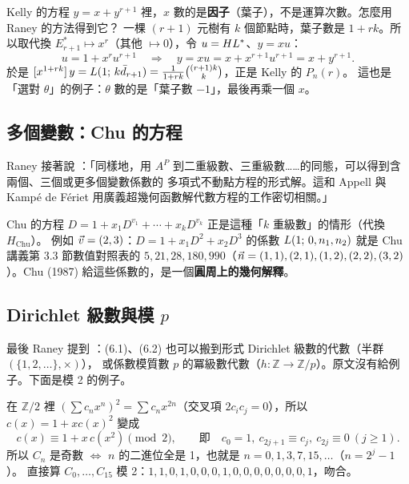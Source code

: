 Kelly 的方程 $y=x+y^{r+1}$ 裡，$x$ 數的是\textbf{因子}（葉子），不是運算次數。怎麼用 Raney 的方法得到它？
一棵 $(r+1)$ 元樹有 $k$ 個節點時，葉子數是 $1+rk$。所以取代換 $E_{r+1}^*\mapsto x^r$（其他 $\mapsto0$），令 $u=HL^{*}$、$y=xu$：
\[
u=1+x^r u^{r+1}\quad\Longrightarrow\quad y=xu=x+x^{r+1}u^{r+1}=x+y^{r+1}.
\]
於是 $[x^{1+rk}]\,y=L(1;\,k\bar d_{r+1})=\frac{1}{1+rk}\binom{(r+1)k}{k}$，正是 Kelly 的 $P_n(r)$。
這也是「選對 $\theta$」的例子：$\theta$ 數的是「葉子數 $-1$」，最後再乘一個 $x$。

\subsection{多個變數：Chu 的方程}

Raney 接著說 ：「同樣地，用 $A^P$ 到二重級數、三重級數……的同態，可以得到含兩個、三個或更多個變數係數的
多項式不動點方程的形式解。這和 Appell 與 Kampé de Fériet 用廣義超幾何函數解代數方程的工作密切相關。」

Chu 的方程 $D=1+x_1D^{v_1}+\cdots+x_kD^{v_k}$ 正是這種「$k$ 重級數」的情形（代換 $H_{\mathrm{Chu}}$）。
例如 $\vec v=(2,3)$：$D=1+x_1D^2+x_2D^3$ 的係數 $L(1;\,0,n_1,n_2)$ 就是 Chu 講義第 3.3 節數值對照表的
$5,21,28,180,990$（$\vec n=(1,1),(2,1),(1,2),(2,2),(3,2)$）。Chu (1987) 給這些係數的，是一個\textbf{圓周上的幾何解釋}。

\subsection{Dirichlet 級數與模 $p$}

最後 Raney 提到 ：(6.1)、(6.2) 也可以搬到形式 Dirichlet 級數的代數（半群 $(\{1,2,\ldots\},\times)$），
或係數模質數 $p$ 的冪級數代數（$h:\mathbb Z\to\mathbb Z/p$）。原文沒有給例子。下面是模 2 的例子。

\begin{exbox}
在 $\mathbb Z/2$ 裡 $(\sum c_nx^n)^2=\sum c_nx^{2n}$（交叉項 $2c_ic_j=0$），所以 $c(x)=1+xc(x)^2$ 變成
\[
c(x)\equiv1+x\,c(x^2)\pmod 2,\qquad\text{即}\quad c_0=1,\ c_{2j+1}\equiv c_j,\ c_{2j}\equiv0\ (j\ge1).
\]
所以 $C_n$ 是奇數 $\iff$ $n$ 的二進位全是 1，也就是 $n=0,1,3,7,15,\ldots$（$n=2^j-1$）。
直接算 $C_0,\ldots,C_{15}$ 模 2：$1,1,0,1,0,0,0,1,0,0,0,0,0,0,0,1$，吻合。
\end{exbox}
